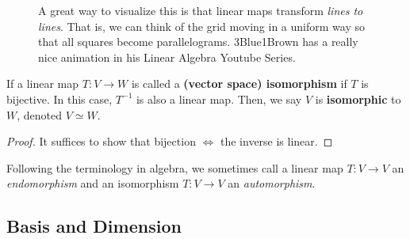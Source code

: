 \begin{definition}
\begin{figure}[H]
      \caption{A great way to visualize this is that linear maps transform \textit{lines to lines}. That is, we can think of the grid moving in a uniform way so that all squares become parallelograms. 3Blue1Brown has a really nice animation in his Linear Algebra Youtube Series.}
      \label{fig:linear_map}
    \end{figure}
  \end{definition}

  \begin{definition}[Isomorphism]
    If a linear map $T: V \to W$ is called a \textbf{(vector space) isomorphism} if $T$ is bijective. In this case, $T^{-1}$ is also a linear map. Then, we say $V$ is \textbf{isomorphic} to $W$, denoted $V \simeq W$. 
  \end{definition}
  \begin{proof}
    It suffices to show that bijection $\iff$ the inverse is linear. 
  \end{proof}

  Following the terminology in algebra, we sometimes call a linear map $T: V \to V$ an \textit{endomorphism} and an isomorphism $T: V \to V$ an \textit{automorphism}. 

\subsection{Basis and Dimension}

